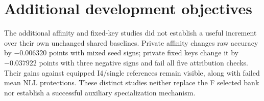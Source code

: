 \section{Additional development objectives}\label{app:auxiliary-development}
The additional affinity and fixed-key studies did not establish a useful increment over their own unchanged shared baselines. Private affinity changes raw accuracy by $-0.006320$ points with mixed seed signs; private fixed keys change it by $-0.037922$ points with three negative signs and fail all five attribution checks. Their gains against equipped I4/single references remain visible, along with failed mean NLL protections. These distinct studies neither replace the F selected bank nor establish a successful auxiliary specialization mechanism.

